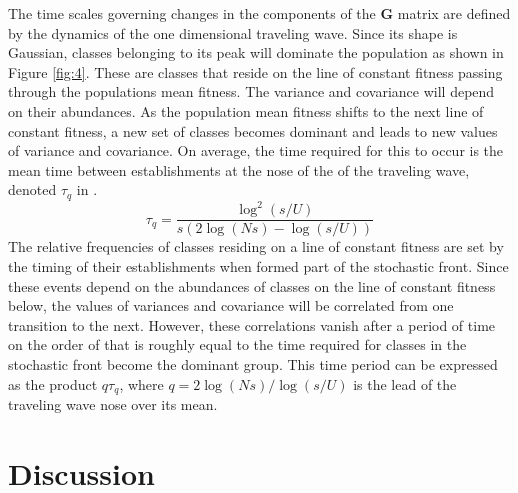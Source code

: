\documentclass[11pt,twocolumn]{article}
\newcommand{\G}{\textbf{G }}
\begin{document}
The time scales governing changes in the components of the \G  matrix are defined by the dynamics of the one dimensional traveling wave. Since its shape is Gaussian, classes belonging to its peak will dominate the population as shown in Figure \ref{fig:4}. These are classes that reside on the line of constant fitness passing through the populations mean fitness. The variance and covariance will depend on their abundances. As the population mean fitness shifts to the next line of constant fitness, a new set of classes becomes dominant and leads to new values of variance and covariance. On average, the time required for this to occur is the mean time between establishments at the nose of the of the traveling wave, denoted $\tau_q$ in \citet{desai2007beneficial}.
\begin{equation}\label{eq:8}
\tau_q = \frac{\log^2(s/U)}{s(2\log(Ns)-\log(s/U))}
\end{equation}
The relative frequencies of classes residing on a line of constant fitness are set by the timing of their establishments when formed part of the stochastic front. Since these events depend on the abundances of classes on the line of constant fitness below, the values of variances and covariance will be correlated from one transition to the next. However, these correlations vanish after a period of time on the order of that is roughly equal to the time required for classes in the stochastic front become the dominant group. This time period can be expressed as the product $q \tau_q$, where $q = 2\log(Ns)/\log(s/U)$ is the lead of the traveling wave nose over its mean. 

\section*{Discussion}
\label{sec:discussion}
\end{document}
